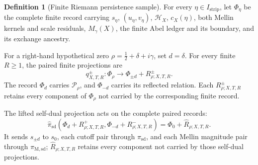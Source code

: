 \documentclass[11pt,a4paper]{article}
\theoremstyle{definition}
\newtheorem{definition}[theorem]{Definition}
\newcommand{\Field}{\Phi}
\begin{document}
\begin{definition}[Finite Riemann persistence sample]
\label{def:finite-riemann-persistence}
For every $\eta\in I_{\mathrm{strip}}$, let $\Phi_\eta$ be the complete finite
record carrying $s_\eta$,
$(u_\eta,v_\eta)$, $\mathcal H_X$, $c_X(\eta)$, both Mellin kernels and scale
residuals, $M_\gamma(X)$, the finite Abel ledger and its boundary, and its
exchange ancestry.

For a right-hand hypothetical zero
$\rho=\tfrac12+\delta+i\gamma$, set $d=\delta$. For every finite $R\geq1$,
the paired finite projections are
\[
  q_{X,T,R}^{\pm}:\Field_\rho\longrightarrow
  \Phi_{\pm d}+R_{\rho;X,T,R}^{\pm}.
\]
The record $\Phi_d$ carries $\mathcal P_\rho$, and $\Phi_{-d}$ carries its
reflected relation. Each $R_{\rho;X,T,R}^{\pm}$ retains every component of
$\Field_\rho$ not carried by the corresponding finite record.

The lifted self-dual projection acts on the complete paired records:
\begin{equation}
\label{eq:lifted-self-dual-projection}
  \widehat\pi_{\mathrm{sd}}
  \left(
    \Phi_d+R_{\rho;X,T,R}^{+},
    \Phi_{-d}+R_{\rho;X,T,R}^{-}
  \right)
  =
  \Phi_0+\widehat R_{\rho;X,T,R}.
\end{equation}
It sends $s_{\pm d}$ to $s_0$, each cutoff pair through
$\pi_{\mathrm{sd}}$, and each Mellin magnitude pair through
$\pi_{\mathrm{M,sd}}$; $\widehat R_{\rho;X,T,R}$ retains every component not
carried by those self-dual projections.


\end{definition}
\end{document}
